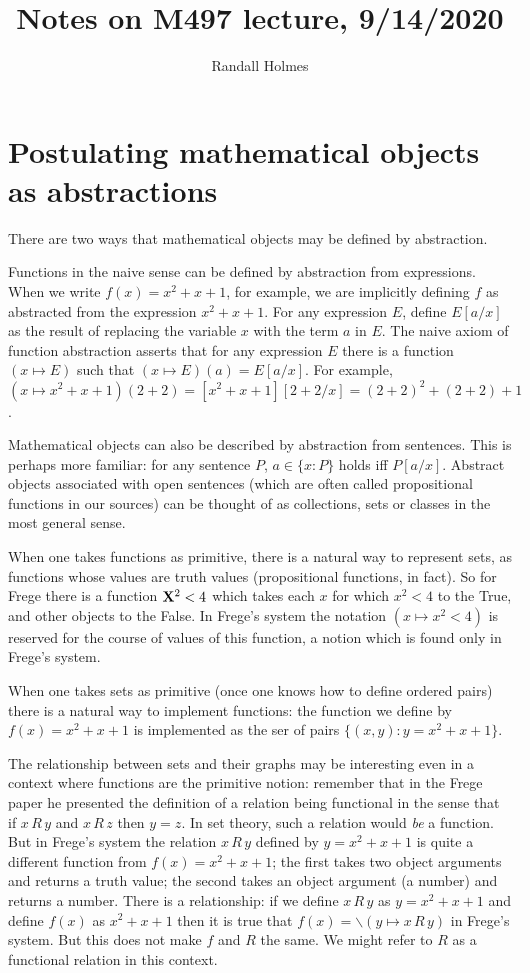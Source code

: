 \documentclass[12pt]{article}
\title{Notes on M497 lecture, 9/14/2020}
\author{Randall Holmes}
\begin{document}
\maketitle

\section{Postulating mathematical objects as abstractions}

There are two ways that mathematical objects may be defined by abstraction.

Functions in the naive sense can be defined by abstraction from expressions.  When we write $f(x) = x^2+x+1$, for example, we are implicitly defining $f$ as abstracted from the expression $x^2+x+1$.  For any expression $E$, define $E[a/x]$ as the result of replacing the variable $x$ with the term $a$ in $E$.  The naive axiom of function abstraction asserts
that for any expression $E$ there is a function $(x \mapsto E)$ such that $(x \mapsto E)(a) = E[a/x]$.   For example, $(x \mapsto x^2+x+1)(2+2) = [x^2+x+1][2+2/x] = (2+2)^2 + (2+2)+1$.

Mathematical objects can also be described by abstraction from sentences.  This is perhaps more familiar:  for any sentence $P$, $a \in \{x :P\}$ holds iff $P[a/x]$.  Abstract objects associated with open sentences (which are often called propositional functions in our sources) can be thought of as collections, sets or classes in the most general sense.

When one takes functions as primitive, there is a natural way to represent sets, as functions whose values are truth values (propositional functions, in fact).  So for Frege
there is a function ${\bf X}^2 <4$ which takes each $x$ for which $x^2<4$ to the True, and other objects to the False.  In Frege's system the notation $(x \mapsto x^2 <4)$ is reserved for the course of values of this function, a notion which is found only in Frege's system.

When one takes sets as primitive (once one knows how to define ordered pairs) there is a natural way to implement functions:  the function we define by $f(x)=x^2+x+1$ is implemented as the ser of pairs $\{(x,y):y = x^2+x+1\}$.

The relationship between sets and their graphs may be interesting even in a context where functions are the primitive notion:  remember that in the Frege paper he presented the 
definition of a relation being functional in the sense that if $x \,R\,y$ and $x \,R\,z$ then $y=z$.  In set theory, such a relation would {\em be\/} a function.  But in Frege's system the
relation $x\,R\,y$ defined by $y=x^2+x+1$ is quite a different function from $f(x)=x^2+x+1$;  the first takes two object arguments and returns a truth value;  the second takes an object argument (a number) and returns a number.  There is a relationship:  if we define $x\,R\,y$ as $y=x^2+x+1$ and define $f(x)$ as $x^2+x+1$ then it is true that
$f(x) = \backslash(y \mapsto x \,R\,y)$ in Frege's system.  But this does not make $f$ and $R$ the same.   We might refer to $R$ as a functional relation in this context.
\end{document}
